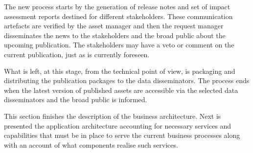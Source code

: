 	The new process starts by the generation of release notes and set of impact assessment reports destined for different stakeholders. These communication artefacts are verified by the asset manager and then the request manager disseminates the news to the stakeholders and the broad public about the upcoming publication. The stakeholders may have a veto or comment on the current publication, just as is currently foreseen.   
	
	What is left, at this stage, from the technical point of view, is packaging and distributing the publication packages to the data disseminators. The process ends when the latest version of published assets are accessible via the selected data disseminators and the broad public is informed. 
	
	This section finishes the description of the business architecture. Next is presented the application architecture accounting for necessary services and capabilities that must be in place to serve the current business processes along with an account of what components realise such services. 
	